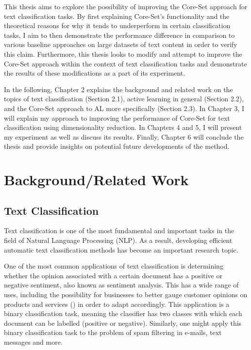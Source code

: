 \documentclass[english,bachelor,ul]{webisthesis} %
\begin{document}
This thesis aims to explore the possibility of improving the Core-Set approach for text classification tasks. By first explaining Core-Set's functionality and the theoretical reasons for why it tends to underperform in certain classification tasks, I aim to then demonstrate the performance difference in comparison to various baseline approaches on large datasets of text content in order to verify this claim. Furthermore, this thesis looks to modify and attempt to improve the Core-Set approach within the context of text classification tasks and demonstrate the results of these modifications as a part of its experiment.

In the following, Chapter 2 explains the background and related work on the topics of text classification (Section 2.1), active learning in general (Section 2.2), and the Core-Set approach to AL more specifically (Section 2.3). In Chapter 3, I will explain my approach to improving the performance of Core-Set for text classification using dimensionality reduction. In Chapters 4 and 5, I will present my experiment as well as discuss its results. Finally, Chapter 6 will conclude the thesis and provide insights on potential future developments of the method. 

\chapter{Background/Related Work}

\section{Text Classification}

Text classification is one of the most fundamental and important tasks in the field of Natural Language Processing (NLP). As a result, developing efficient automatic text classification methods has become an important research topic. 

One of the most common applications of text classification is determining whether the opinion associated with a certain document has a positive or negative sentiment, also known as sentiment analysis. This has a wide range of uses, including the possibility for businesses to better gauge customer opinions on products and services (\cite{DBLP:books/sp/mining2012/LiuZ12}) in order to adapt accordingly. This application is a binary classification task, meaning the classifier has two classes with which each document can be labelled (positive or negative). Similarly, one might apply this binary classification task to the problem of spam filtering in e-mails, text messages and more. 
\end{document}
